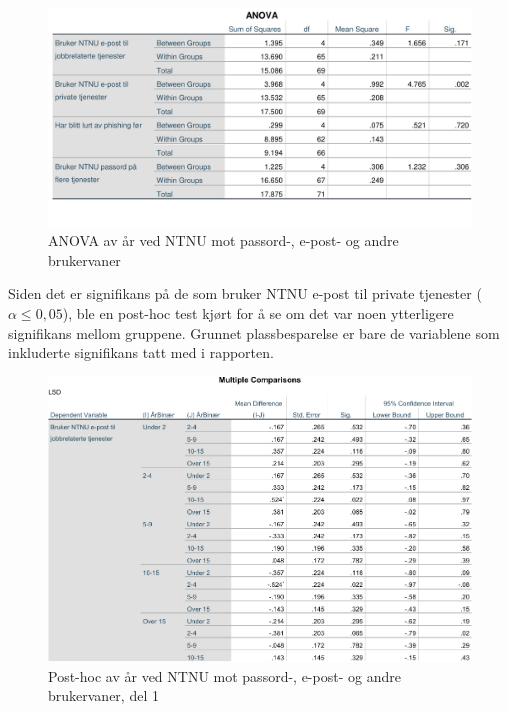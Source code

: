 \begin{figure}[H]
    \centering
    \includegraphics[scale=0.7]{case_2/bilder/spss/anova_ttest/ansiennitet_diverse_anova.pdf}
    \caption[ansiennitet-diverse-ANOVA]{ANOVA av år ved NTNU mot passord-, e-post- og andre brukervaner}
    \label{fig:ansiennitet-diverse-ANOVA}
\end{figure}

Siden det er signifikans på de som bruker NTNU e-post til private tjenester (\(\alpha \leq 0,05\)), ble en post-hoc test kjørt for å se om det var noen ytterligere signifikans mellom gruppene. Grunnet plassbesparelse er bare de variablene som inkluderte signifikans tatt med i rapporten. 
\begin{figure}[H]
    \centering
    \includegraphics[scale=0.7]{case_2/bilder/spss/anova_ttest/ansiennitet_diverse_posthoc_1.pdf}
    \caption[ansiennitet-diverse-posthoc-1]{Post-hoc av år ved NTNU mot passord-, e-post- og andre brukervaner, del 1}
    \label{fig:alder-bevissthetogkjennskap-descriptive-1}
\end{figure}

